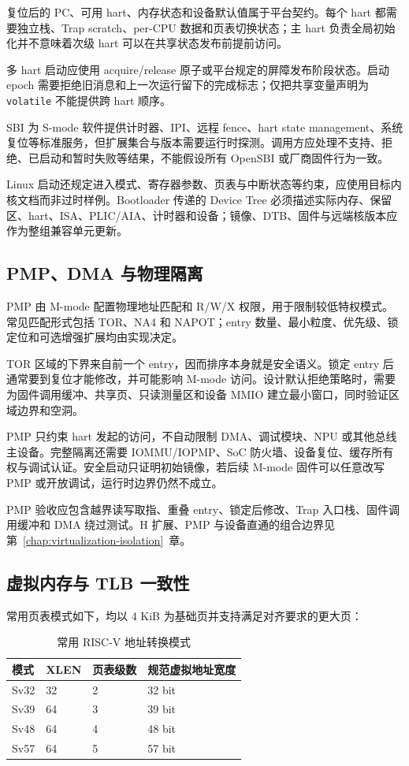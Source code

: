 复位后的 PC、可用 hart、内存状态和设备默认值属于平台契约。每个 hart 都需要独立栈、Trap scratch、per-CPU 数据和页表切换状态；主 hart 负责全局初始化并不意味着次级 hart 可以在共享状态发布前提前访问。

多 hart 启动应使用 acquire/release 原子或平台规定的屏障发布阶段状态。启动 epoch 需要拒绝旧消息和上一次运行留下的完成标志；仅把共享变量声明为 \texttt{volatile} 不能提供跨 hart 顺序。

SBI 为 S-mode 软件提供计时器、IPI、远程 fence、hart state management、系统复位等标准服务，但扩展集合与版本需要运行时探测。调用方应处理不支持、拒绝、已启动和暂时失败等结果，不能假设所有 OpenSBI 或厂商固件行为一致。

Linux 启动还规定进入模式、寄存器参数、页表与中断状态等约束，应使用目标内核文档而非过时样例\cite{linux-riscv-booting}。Bootloader 传递的 Device Tree 必须描述实际内存、保留区、hart、ISA、PLIC/AIA、计时器和设备；镜像、DTB、固件与远端核版本应作为整组兼容单元更新。

\subsection{PMP、DMA 与物理隔离}

PMP 由 M-mode 配置物理地址匹配和 R/W/X 权限，用于限制较低特权模式。常见匹配形式包括 TOR、NA4 和 NAPOT；entry 数量、最小粒度、优先级、锁定位和可选增强扩展均由实现决定。

TOR 区域的下界来自前一个 entry，因而排序本身就是安全语义。锁定 entry 后通常要到复位才能修改，并可能影响 M-mode 访问。设计默认拒绝策略时，需要为固件调用缓冲、共享页、只读测量区和设备 MMIO 建立最小窗口，同时验证区域边界和空洞。

PMP 只约束 hart 发起的访问，不自动限制 DMA、调试模块、NPU 或其他总线主设备。完整隔离还需要 IOMMU/IOPMP、SoC 防火墙、设备复位、缓存所有权与调试认证。安全启动只证明初始镜像，若后续 M-mode 固件可以任意改写 PMP 或开放调试，运行时边界仍然不成立。

PMP 验收应包含越界读写取指、重叠 entry、锁定后修改、Trap 入口栈、固件调用缓冲和 DMA 绕过测试。H 扩展、PMP 与设备直通的组合边界见第~\ref{chap:virtualization-isolation}~章。

\subsection{虚拟内存与 TLB 一致性}

常用页表模式如下，均以 4 KiB 为基础页并支持满足对齐要求的更大页：
\begin{table}[H]
  \centering
  \caption{常用 RISC-V 地址转换模式}
  \begin{tabular}{llll}
    \hline
    模式 & XLEN & 页表级数 & 规范虚拟地址宽度 \\
    \hline
    Sv32 & 32 & 2 & 32 bit \\
    Sv39 & 64 & 3 & 39 bit \\
    Sv48 & 64 & 4 & 48 bit \\
    Sv57 & 64 & 5 & 57 bit \\
    \hline
  \end{tabular}
\end{table}


